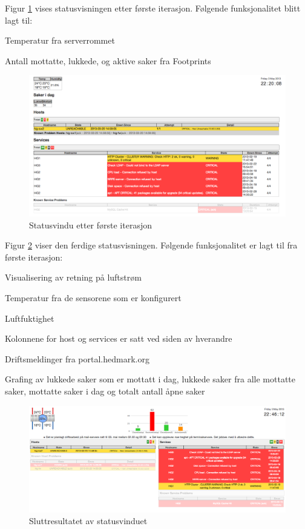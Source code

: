 Figur \ref{statusvindu_first} vises statusvisningen etter første iterasjon. Følgende funksjonalitet blitt lagt til:
\begin{itemize*}
	\item Temperatur fra serverrommet
	\item Antall mottatte, lukkede, og aktive saker fra Footprints
\end{itemize*}

\begin{figure}[H]
    \centering
    \includegraphics[scale=0.3]{img/statusvindu_first}
    \caption{Statusvindu etter første iterasjon}
    \label{statusvindu_first}
\end{figure}

Figur \ref{statusvindu_final} viser den ferdige statusvisningen. Følgende funksjonalitet er lagt til fra første iterasjon:

\begin{itemize*}
	\item Visualisering av retning på luftstrøm
	\item Temperatur fra de sensorene som er konfigurert
	\item Luftfuktighet
	\item Kolonnene for host og services er satt ved siden av hverandre
	\item Driftsmeldinger fra portal.hedmark.org
	\item Grafing av lukkede saker som er mottatt i dag, lukkede saker fra alle mottatte saker, mottatte saker i dag og totalt antall åpne saker
\end{itemize*}

\begin{figure}[H]
    \centering
    \includegraphics[scale=0.3]{img/statusvindu_final}
    \caption{Sluttresultatet av statusvinduet}
    \label{statusvindu_final}
\end{figure}


